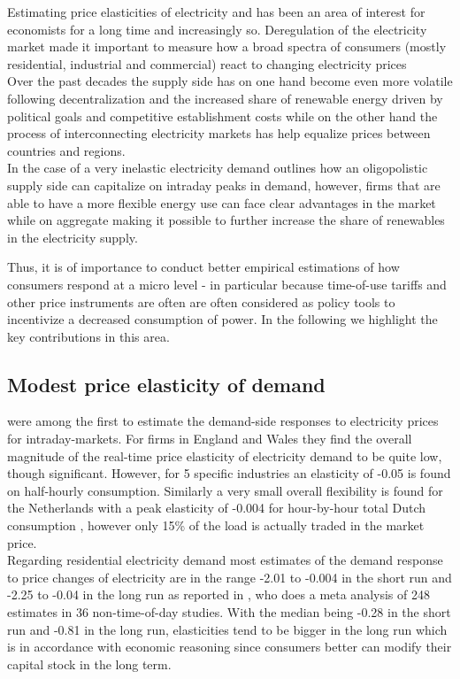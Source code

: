 \label{sec:background}
Estimating price elasticities of electricity and has been an area of interest for economists for a long time and increasingly so. Deregulation of the electricity market made it important to measure how a broad spectra of consumers (mostly residential, industrial and commercial) react to changing electricity prices
\medskip\\
Over the past decades the supply side has on one hand become even more volatile following decentralization and the increased share of renewable energy driven by political goals and competitive establishment costs while on the other hand the process of interconnecting electricity markets has help equalize prices between countries and regions.
\medskip\\
In the case of a very inelastic electricity demand \citet{wolak2001impact} outlines how an oligopolistic supply side can capitalize on intraday peaks in demand, however, firms that are able to have a more flexible energy use can face clear advantages in the market while on aggregate making it possible to further increase the share of renewables in the electricity supply.
\par
Thus, it is of importance to conduct better empirical estimations of how consumers respond at a micro level - in particular because time-of-use tariffs and other price instruments are often are often considered as policy tools to incentivize a decreased consumption of power. In the following we highlight the key contributions in this area.

\subsection{Modest price elasticity of demand}
\label{subsec:b_results}
\citet{patrick2001estimating} were among the first to estimate the demand-side responses to electricity prices for intraday-markets. For firms in England and Wales they find the overall magnitude of the real-time price elasticity of electricity demand to be quite low, though significant. However, for 5 specific industries an elasticity of -0.05 is found on half-hourly consumption. Similarly a very small overall flexibility is found for the Netherlands with a peak elasticity of -0.004 for hour-by-hour total Dutch consumption \citet{lijesen2007real}, however only 15\% of the load is actually traded in the market price.
\medskip\\
Regarding residential electricity demand most estimates of the demand response to price changes of electricity are in the range -2.01 to -0.004 in the short run and -2.25 to -0.04 in the long run as reported in \citet{espey2004turning}, who does a meta analysis of 248 estimates in 36 non-time-of-day studies. With the median being -0.28 in the short run and -0.81 in the long run, elasticities tend to be bigger in the long run which is in accordance with economic reasoning since consumers better can modify their capital stock in the long term.

